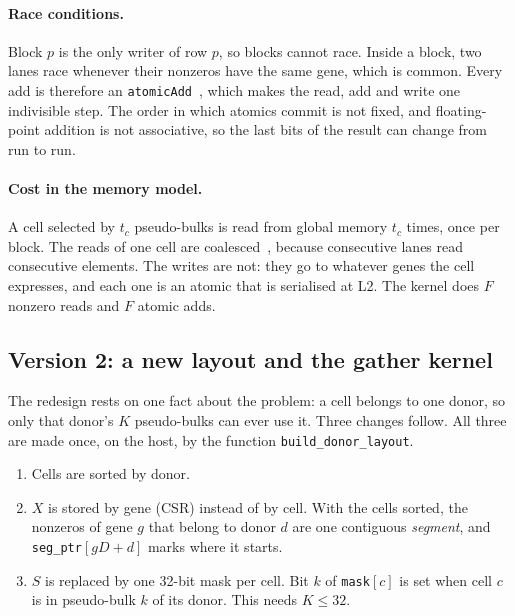 \documentclass[sigconf,nonacm]{acmart}
\newcommand{\code}[1]{\texttt{#1}}
\begin{document}
\paragraph{Race conditions.} Block $p$ is the only writer of row $p$, so blocks cannot race. Inside
a block, two lanes race whenever their nonzeros have the same gene, which is common. Every add is
therefore an \code{atomicAdd}~\cite{cudaguide}, which makes the read, add and write one indivisible step. The order
in which atomics commit is not fixed, and floating-point addition is not associative, so the last
bits of the result can change from run to run.

\paragraph{Cost in the memory model.} A cell selected by $t_c$ pseudo-bulks is read from global
memory $t_c$ times, once per block. The reads of one cell are coalesced~\cite{cheng2014}, because
consecutive lanes read consecutive elements. The writes are not: they go to whatever genes the cell expresses, and
each one is an atomic that is serialised at L2. The kernel does $F$ nonzero reads and $F$ atomic adds.

\subsection{Version 2: a new layout and the gather kernel}

The redesign rests on one fact about the problem: a cell belongs to one donor, so only that donor's
$K$ pseudo-bulks can ever use it. Three changes follow. All three are made once, on the host, by the
function \code{build\_donor\_layout}.
\begin{enumerate}
\item Cells are sorted by donor.
\item $X$ is stored by gene (CSR) instead of by cell. With the cells sorted, the nonzeros of gene $g$
that belong to donor $d$ are one contiguous \emph{segment}, and \code{seg\_ptr}$[gD+d]$ marks where
it starts.
\item $S$ is replaced by one 32-bit mask per cell. Bit $k$ of \code{mask}$[c]$ is set when cell $c$
is in pseudo-bulk $k$ of its donor. This needs $K \le 32$.
\end{enumerate}
\end{document}
